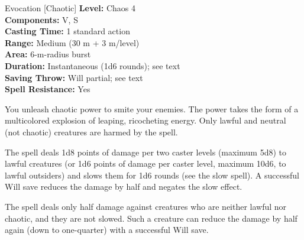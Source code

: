 {Evocation [Chaotic]}
{
	\textbf{Level:}
	Chaos 4\\
	\textbf{Components:}
	V, S\\
	\textbf{Casting Time:}
	1 standard action\\
	\textbf{Range:}
	Medium (30 m + 3 m/level)\\
	\textbf{Area:}
	6-m-radius burst\\
	\textbf{Duration:}
	Instantaneous (1d6 rounds); see text\\
	\textbf{Saving Throw:}
	Will partial; see text\\
	\textbf{Spell Resistance:}
	Yes\\
}
{
	You unleash chaotic power to smite your enemies. The power takes the form of a multicolored explosion of leaping, ricocheting energy. Only lawful and neutral (not chaotic) creatures are harmed by the spell.

	The spell deals 1d8 points of damage per two caster levels (maximum 5d8) to lawful creatures (or 1d6 points of damage per caster level, maximum 10d6, to lawful outsiders) and slows them for 1d6 rounds (see the slow spell). A successful Will save reduces the damage by half and negates the slow effect.

	The spell deals only half damage against creatures who are neither lawful nor chaotic, and they are not slowed. Such a creature can reduce the damage by half again (down to one-quarter) with a successful Will save.

}
